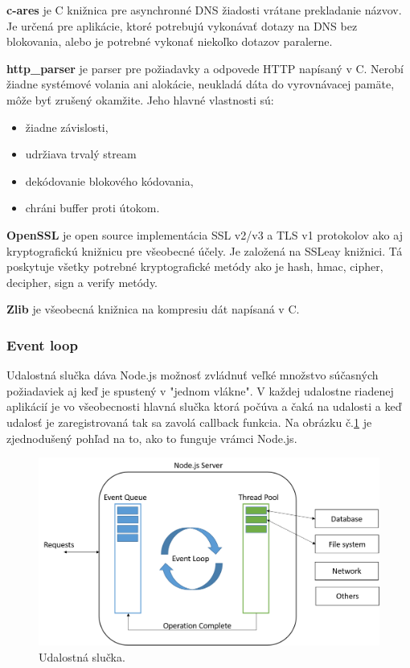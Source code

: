 \textbf{c-ares} je C knižnica pre asynchronné DNS žiadosti vrátane prekladanie názvov. Je určená pre aplikácie, ktoré potrebujú vykonávať dotazy na DNS bez blokovania, alebo je potrebné vykonať niekoľko dotazov paralerne.

\textbf{http\_parser} je parser pre požiadavky a odpovede  HTTP napísaný v C. Nerobí žiadne systémové volania ani alokácie, neukladá dáta do vyrovnávacej pamäte, môže byť zrušený okamžite. Jeho hlavné vlastnosti sú:
\begin{itemize}
\item žiadne závislosti,
\item udržiava trvalý stream
\item dekódovanie blokového kódovania,
\item chráni buffer proti útokom.
\end{itemize}

\textbf{OpenSSL} je open source implementácia SSL v2/v3 a TLS v1 protokolov ako aj kryptografickú knižnicu pre všeobecné účely. Je založená na SSLeay knižnici. Tá poskytuje všetky potrebné kryptografické metódy ako je hash, hmac, cipher, decipher, sign a verify metódy.

\textbf{Zlib} je všeobecná knižnica na kompresiu dát napísaná v C.\cite{nodejs-arch}


\subsubsection{Event loop}
Udalostná slučka dáva Node.js možnosť zvládnuť veľké množstvo súčasných požiadaviek aj keď je spustený v "jednom vlákne". V každej udalostne riadenej aplikácií je vo všeobecnosti hlavná slučka ktorá počúva a čaká na udalosti a keď udalosť je zaregistrovaná tak sa zavolá callback funkcia. Na obrázku č.\ref{img-node-event-loop} je zjednodušený pohľad na to, ako to funguje vrámci Node.js.

\begin{figure}[H]
  \centering
  \includegraphics[scale=0.6]{img/node/nodejs-event-loop.png}
  \caption{Udalostná slučka.}
  \label{img-node-event-loop}
\end{figure}

